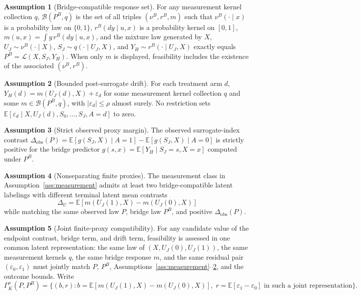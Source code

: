 \documentclass[11pt]{article}
\newcommand{\E}{\mathbb{E}}
\theoremstyle{definition}
\newtheorem{assumption}{Assumption}
\theoremstyle{plain}
\theoremstyle{remark}
\begin{document}
\begin{assumption}[Bridge-compatible response set]\label{ass:bridge}
For any measurement kernel collection \(q\), \(\mathcal{B}(P^B,q)\) is the set of all triples \((\nu^B,r^B,m)\) such that \(\nu^B(\cdot\mid x)\) is a probability law on \(\{0,1\}\), \(r^B(dy\mid u,x)\) is a probability kernel on \([0,1]\), \(m(u,x)=\int y\,r^B(dy\mid u,x)\), and the mixture law generated by \(X\), \(U_J\sim\nu^B(\cdot\mid X)\), \(S_J\sim q(\cdot\mid U_J,X)\), and \(Y_H\sim r^B(\cdot\mid U_J,X)\) exactly equals \(P^B=\mathcal{L}(X,S_J,Y_H)\).  When only \(m\) is displayed, feasibility includes the existence of the associated \((\nu^B,r^B)\).
\end{assumption}

\begin{assumption}[Bounded post-surrogate drift]\label{ass:drift}
For each treatment arm \(d\), \(Y_H(d)=m(U_J(d),X)+\varepsilon_d\) for some measurement kernel collection \(q\) and some \(m\in\mathcal{B}(P^B,q)\), with \(|\varepsilon_d|\le\rho\) almost surely.  No restriction sets \(\E[\varepsilon_d\mid X,U_J(d),S_0,\ldots,S_J,A=d]\) to zero.
\end{assumption}

\begin{assumption}[Strict observed proxy margin]\label{ass:positive-proxy-margin}
The observed surrogate-index contrast \(\Delta_{\mathrm{obs}}(P)=\E[g(S_J,X)\mid A=1]-\E[g(S_J,X)\mid A=0]\) is strictly positive for the bridge predictor \(g(s,x)=\E[Y_H\mid S_J=s,X=x]\) computed under \(P^B\).
\end{assumption}

\begin{assumption}[Nonseparating finite proxies]\label{ass:nonseparating}
The measurement class in Assumption~\ref{ass:measurement} admits at least two bridge-compatible latent labelings with different terminal latent mean contrasts
\[
  \Delta_U=\E[m(U_J(1),X)-m(U_J(0),X)]
\]
while matching the same observed law \(P\), bridge law \(P^B\), and positive \(\Delta_{\mathrm{obs}}(P)\).
\end{assumption}

\begin{assumption}[Joint finite-proxy compatibility]\label{ass:joint-compatibility}
For any candidate value of the endpoint contrast, bridge term, and drift term, feasibility is assessed in one common latent representation: the same law of \((X,U_J(0),U_J(1))\), the same measurement kernels \(q\), the same bridge response \(m\), and the same residual pair \((\varepsilon_0,\varepsilon_1)\) must jointly match \(P\), \(P^B\), Assumptions~\ref{ass:measurement}--\ref{ass:drift}, and the outcome bounds.  Write
\[
  \Gamma_K^\rho(P,P^B)=
  \{(b,r): b=\E[m(U_J(1),X)-m(U_J(0),X)],\;
             r=\E[\varepsilon_1-\varepsilon_0]
     \text{ in such a joint representation}\}.
\]
\end{assumption}
\end{document}
